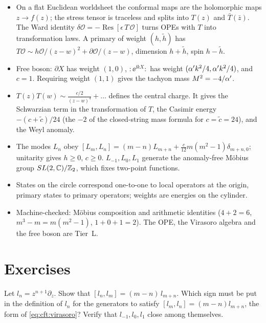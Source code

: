 \begin{summarybox}
\begin{itemize}[leftmargin=*,itemsep=1pt]
\item On a flat Euclidean worldsheet the conformal maps are the holomorphic maps $z\to f(z)$; the
 stress tensor is traceless and splits into $T(z)$ and $\bar T(\bar z)$. The Ward identity
 $\delta\mathcal O=-\operatorname{Res}[\epsilon\,T\,\mathcal O]$ turns OPEs with $T$ into
 transformation laws. A primary of weight $(h,\tilde h)$ has
 $T\mathcal O\sim h\mathcal O/(z-w)^2+\partial\mathcal O/(z-w)$, dimension $h+\tilde h$, spin
 $h-\tilde h$.
\item Free boson: $\partial X$ has weight $(1,0)$, $:\!\ee^{\ii kX}\!:$ has weight
 $(\alpha' k^2/4,\alpha' k^2/4)$, and $c=1$. Requiring weight $(1,1)$ gives the tachyon mass
 $M^2=-4/\alpha'$.
\item $T(z)T(w)\sim\frac{c/2}{(z-w)^4}+\dots$ defines the central charge. It gives the Schwarzian
 term in the transformation of $T$, the Casimir energy $-(c+\tilde c)/24$ (the $-2$ of the
 closed-string mass formula for $c=\tilde c=24$), and the Weyl anomaly.
\item The modes $L_n$ obey
 $[L_m,L_n]=(m-n)L_{m+n}+\frac c{12}m(m^2-1)\delta_{m+n,0}$; unitarity gives $h\ge0$, $c\ge0$.
 $L_{-1},L_0,L_1$ generate the anomaly-free M\"obius group $SL(2,\mathbb{C})/\mathbb{Z}_2$, which fixes two-point
 functions.
\item States on the circle correspond one-to-one to local operators at the origin, primary
 states to primary operators; weights are energies on the cylinder.
\item Machine-checked: M\"obius composition and arithmetic identities ($4+2=6$,
 $m^3-m=m(m^2-1)$, $1+0+1=2$). The OPE, the Virasoro algebra and the free boson are Tier~L.
\end{itemize}
\end{summarybox}

\section*{Exercises}

\begin{exercise}[$\star$]\label{exr:cft:witt}
Let $l_n=z^{n+1}\partial_z$. Show that $[l_n,l_m]=(m-n)\,l_{m+n}$. Which sign must be put in the
definition of $l_n$ for the generators to satisfy $[l_m,l_n]=(m-n)l_{m+n}$, the form of
\eqref{eq:cft:virasoro}? Verify that $l_{-1},l_0,l_1$ close among themselves.
\end{exercise}

